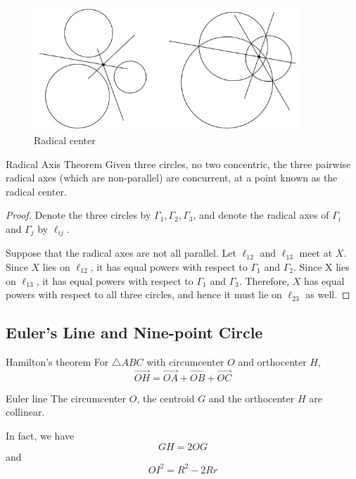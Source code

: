 \begin{figure}[H]
    \centering
    \includegraphics[width=10cm]{images/Radical_center.jpg}
    \caption{Radical center}
\end{figure}

\begin{thrm}{Radical Axis Theorem}{}
Given three circles, no two concentric, the three pairwise radical axes (which are non-parallel) are concurrent, at a point known as the radical center.
\end{thrm}

\begin{proof}
Denote the three circles by $\Gamma_1, \Gamma_2, \Gamma_3$, and denote the radical axes of $\Gamma_i$ and $\Gamma_j$ by $\ell_{ij}$.

Suppose that the radical axes are not all parallel. Let $\ell_{12}$ and $\ell_{13}$ meet at $X$. Since $X$ lies on $\ell_{12}$, it has equal powers with respect to $\Gamma_1$ and $\Gamma_2$. Since X lies on $\ell_{13}$, it has equal powers with respect to $\Gamma_1$ and $\Gamma_3$. Therefore, $X$ has equal powers with respect to all three circles, and hence it must lie on $\ell_{23}$ as well.
\end{proof}

\subsection{Euler's Line and Nine-point Circle}
\begin{thrm}{Hamilton's theorem}{}
For $\triangle ABC$ with circumcenter $O$ and orthocenter $H$,
\[ \overrightarrow{OH} = \overrightarrow{OA} + \overrightarrow{OB} + \overrightarrow{OC} \]
\end{thrm}

\begin{thrm}{Euler line}{}
The circumcenter $O$, the centroid $G$ and the orthocenter $H$ are collinear.

In fact, we have 
\[ GH=2 OG \]
and
\[ OI^2 = R^2-2Rr \]
\end{thrm}

